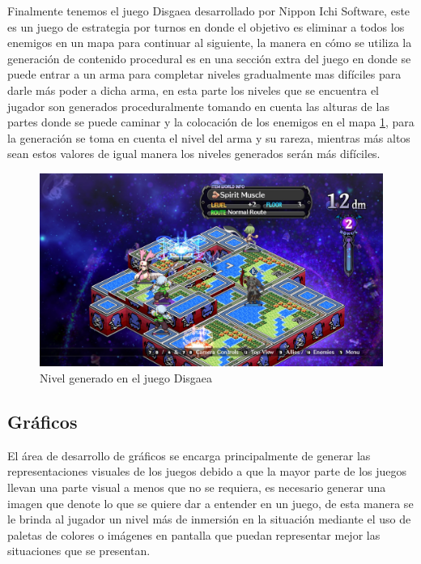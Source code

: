 Finalmente tenemos el juego Disgaea desarrollado por Nippon Ichi Software, este
es un juego de estrategia por turnos en donde el objetivo es eliminar a todos
los enemigos en un mapa para continuar al siguiente, la manera en cómo se
utiliza la generación de contenido procedural es en una sección extra del juego
en donde se puede entrar a un arma para completar niveles gradualmente mas
difíciles para darle más poder a dicha arma, en esta parte los niveles que se
encuentra el jugador son generados proceduralmente tomando en cuenta las alturas
de las partes donde se puede caminar y la colocación de los enemigos en el mapa
\ref{figure:DisgaeaIW}, para la generación se toma en cuenta el nivel del arma y
su rareza, mientras más altos sean estos valores de igual manera los niveles
generados serán más difíciles.

\begin{figure}
    \centering
    \includegraphics[width=1.0\textwidth]{img/DisgaeaIW.png}
    \caption{Nivel generado en el juego Disgaea}
    \label{figure:DisgaeaIW}
\end{figure}

\subsection{Gráficos}
\label{subsection:Visuals}

El área de desarrollo de gráficos se encarga principalmente de generar las
representaciones visuales de los juegos debido a que la mayor parte de los
juegos llevan una parte visual a menos que no se requiera, es necesario generar
una imagen que denote lo que se quiere dar a entender en un juego, de esta
manera se le brinda al jugador un nivel más de inmersión en la situación
mediante el uso de paletas de colores o imágenes en pantalla que puedan
representar mejor las situaciones que se presentan.

